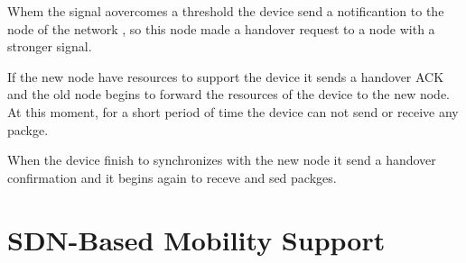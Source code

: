 \documentclass[12pt]{article}
\begin{document}
Whem the signal aovercomes a threshold the device send a notificantion to the node of the network , so this node made a handover request to a node with a stronger signal.

If the new node have resources to support the device it sends a handover ACK and the old node begins to forward the resources of the device to the new node. At this moment, for a short period of time the device can not send or receive any packge.

When the device finish to synchronizes with the new node it send a handover confirmation and it begins again to receve and sed packges.


\section{SDN-Based Mobility Support}
\end{document}
